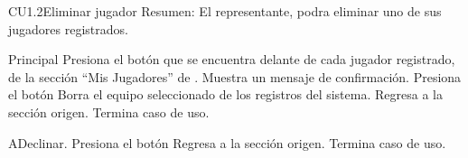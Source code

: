 


	\begin{UseCase}{CU1.2}{Eliminar jugador}{
		Resumen: El representante, podra eliminar uno de sus jugadores registrados.}
	\end{UseCase}
	\newpage
	
	\begin{UCtrayectoria}{Principal}
	\UCpaso[\UCactor] Presiona el botón  que se encuentra delante de cada jugador registrado, de la sección ``Mis Jugadores'' de .
	\UCpaso Muestra un mensaje de confirmación.
	\UCpaso[\UCactor]Presiona el botón  
	\UCpaso Borra el equipo seleccionado de los registros del sistema.
	\UCpaso Regresa a la sección origen.
	\UCpaso Termina caso de uso.
\end{UCtrayectoria}
	
	\begin{UCtrayectoriaA}{A}{Declinar.}
	    \UCpaso Presiona el botón 
		\UCpaso Regresa a la sección origen.
		\UCpaso Termina caso de uso.
	\end{UCtrayectoriaA}
